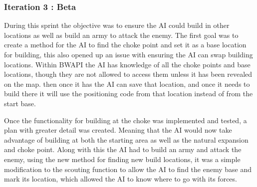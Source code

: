 \documentclass[journal]{IEEEtran}
\begin{document}
\subsubsection{Iteration 3 : Beta}
During this sprint the objective was to ensure the AI could build in other locations as well as build an army to attack the enemy. The first goal was to create a method for the AI to find the choke point and set it as a base location for building, this also opened up an issue with ensuring the AI can swap building locations. Within BWAPI the AI has knowledge of all the choke points and base locations, though they are not allowed to access them unless it has been revealed on the map. then once it has the AI can save that location, and once it needs to build there it will use the positioning code from that location instead of from the start base. 

Once the functionality for building at the choke was implemented and tested, a plan with greater detail was created. Meaning that the AI would now take advantage of building at both the starting area as well as the natural expansion and choke point. Along with this the AI had to build an army and attack the enemy, using the new method for finding new build locations, it was a simple modification to the scouting function to allow the AI to find the enemy base and mark its location, which allowed the AI to know where to go with its forces.
\newline
\end{document}
